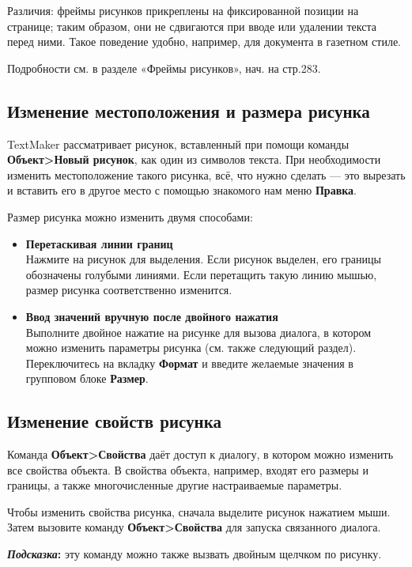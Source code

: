 \documentclass[a4paper,10pt]{article}
\begin{document}
Различия: фреймы рисунков прикреплены на фиксированной позиции на странице; таким образом, они не сдвигаются при вводе или удалении текста перед ними. Такое поведение удобно, например, для документа в газетном стиле.

Подробности см. в разделе «Фреймы рисунков», нач. на стр.283.

\subsection{Изменение местоположения и размера рисунка}
TextMaker рассматривает рисунок, вставленный при помощи команды \textbf{Объект>Новый рисунок}, как один из символов текста. При необходимости изменить местоположение такого рисунка, всё, что нужно сделать --- это вырезать и вставить его в другое место с помощью знакомого нам меню \textbf{Правка}.

Размер рисунка можно изменить двумя способами:

\begin{itemize}
 \item \textbf{Перетаскивая линии границ}\\
 Нажмите на рисунок для выделения. Если рисунок выделен, его границы обозначены голубыми линиями. Если перетащить такую линию мышью, размер рисунка соответственно изменится.
 \item \textbf{Ввод значений вручную после двойного нажатия}\\
 Выполните двойное нажатие на рисунке для вызова диалога, в котором можно изменить параметры рисунка (см. также следующий раздел). Переключитесь на вкладку \textbf{Формат} и введите желаемые значения в групповом блоке \textbf{Размер}.
\end{itemize}

\subsection{Изменение свойств рисунка}
Команда \textbf{Объект>Свойства} даёт доступ к диалогу, в котором можно изменить все свойства объекта. В свойства объекта, например, входят его размеры и границы, а также многочисленные другие настраиваемые параметры.

Чтобы изменить свойства рисунка, сначала выделите рисунок нажатием мыши. Затем вызовите команду \textbf{Объект>Свойства} для запуска связанного диалога.

\begin{mdframed}[backgroundcolor=blue!10]
\textbf{\textit{Подсказка}:} эту команду можно также вызвать двойным щелчком по рисунку.
\end{mdframed}
\end{document}
